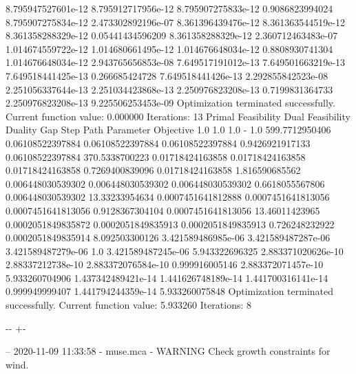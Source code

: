 \documentclass[letterpaper,10pt,english]{sphinxmanual}
\newlength\nbsphinxcodecellspacing
\begin{document}
{\begin{sphinxVerbatim}[commandchars=\\\{\}]
8.795947527601e-12  8.795912717956e-12  8.795907275833e-12  0.9086823994024  8.795907275834e-12  2.473302892196e-07
8.361396439476e-12  8.361363544519e-12  8.361358288329e-12  0.05441434596209 8.361358288329e-12  2.360712463483e-07
1.014674559722e-12  1.014680661495e-12  1.014676648034e-12  0.8808930741304  1.014676648034e-12  2.943765656853e-08
7.649517191012e-13  7.649501663219e-13  7.649518441425e-13  0.266685424728   7.649518441426e-13  2.292855842523e-08
2.251056337644e-13  2.251034423868e-13  2.250976823208e-13  0.7199831364733  2.250976823208e-13  9.225506253453e-09
Optimization terminated successfully.
         Current function value: 0.000000
         Iterations: 13
Primal Feasibility  Dual Feasibility    Duality Gap         Step             Path Parameter      Objective
1.0                 1.0                 1.0                 -                1.0                 599.7712950406
0.06108522397884    0.06108522397884    0.06108522397884    0.9426921917133  0.06108522397884    370.5338700223
0.01718424163858    0.01718424163858    0.01718424163858    0.7269400839096  0.01718424163858    1.816590685562
0.006448030539302   0.006448030539302   0.006448030539302   0.6618055567806  0.006448030539302   13.33233954634
0.0007451641812888  0.0007451641813056  0.0007451641813056  0.9128367304104  0.0007451641813056  13.46011423965
0.0002051849835872  0.0002051849835913  0.0002051849835913  0.726248232922   0.0002051849835914  8.092503300126
3.421589486985e-06  3.421589487287e-06  3.421589487279e-06  1.0              3.421589487245e-06  5.943322696325
2.883371020626e-10  2.88337212738e-10   2.883372076584e-10  0.999916005146   2.883372071457e-10  5.933260704906
1.437342489421e-14  1.441626748189e-14  1.441700316141e-14  0.999949999407   1.441794244359e-14  5.933260075848
Optimization terminated successfully.
         Current function value: 5.933260
         Iterations: 8
\end{sphinxVerbatim}
}

{

\kern-\sphinxverbatimsmallskipamount\kern-\baselineskip
\kern+\FrameHeightAdjust\kern-\fboxrule
\vspace{\nbsphinxcodecellspacing}

\begin{sphinxVerbatim}[commandchars=\\\{\}]
-- 2020-11-09 11:33:58 - muse.mca - WARNING
Check growth constraints for wind.

\end{sphinxVerbatim}
}
\end{document}
